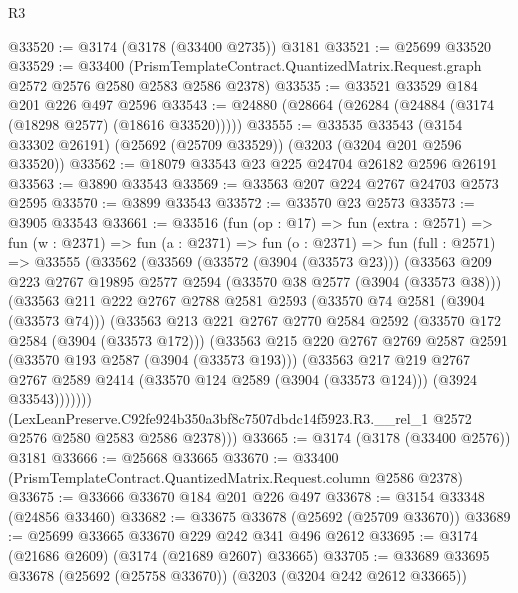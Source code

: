 \begin{lexlean}{R3}
\begin{coremodule}
@33520 := @3174 (@3178 (@33400 @2735)) @3181
@33521 := @25699 @33520
@33529 := @33400
    (PrismTemplateContract.QuantizedMatrix.Request.graph @2572 @2576 @2580 @2583 @2586 @2378)
@33535 := @33521 @33529 @184 @201 @226 @497 @2596
@33543 := @24880 (@28664 (@26284 (@24884 (@3174 (@18298 @2577) (@18616 @33520)))))
@33555 := @33535
    @33543
    (@3154 @33302 @26191)
    (@25692 (@25709 @33529))
    (@3203 (@3204 @201 @2596 @33520))
@33562 := @18079 @33543 @23 @225 @24704 @26182 @2596 @26191
@33563 := @3890 @33543
@33569 := @33563 @207 @224 @2767 @24703 @2573 @2595
@33570 := @3899 @33543
@33572 := @33570 @23 @2573
@33573 := @3905 @33543
@33661 := @33516
    (fun (op : @17) =>
    fun (extra : @2571) =>
    fun (w : @2371) =>
    fun (a : @2371) =>
    fun (o : @2371) =>
    fun (full : @2571) =>
    @33555
      (@33562
        (@33569
          (@33572 (@3904 (@33573 @23)))
          (@33563
            @209
            @223
            @2767
            @19895
            @2577
            @2594
            (@33570 @38 @2577 (@3904 (@33573 @38)))
            (@33563
              @211
              @222
              @2767
              @2788
              @2581
              @2593
              (@33570 @74 @2581 (@3904 (@33573 @74)))
              (@33563
                @213
                @221
                @2767
                @2770
                @2584
                @2592
                (@33570 @172 @2584 (@3904 (@33573 @172)))
                (@33563
                  @215
                  @220
                  @2767
                  @2769
                  @2587
                  @2591
                  (@33570 @193 @2587 (@3904 (@33573 @193)))
                  (@33563
                    @217
                    @219
                    @2767
                    @2767
                    @2589
                    @2414
                    (@33570 @124 @2589 (@3904 (@33573 @124)))
                    (@3924 @33543)))))))
        (LexLeanPreserve.C92fe924b350a3bf8c7507dbdc14f5923.R3.__rel_1
          @2572
          @2576
          @2580
          @2583
          @2586
          @2378)))
@33665 := @3174 (@3178 (@33400 @2576)) @3181
@33666 := @25668 @33665
@33670 := @33400 (PrismTemplateContract.QuantizedMatrix.Request.column @2586 @2378)
@33675 := @33666 @33670 @184 @201 @226 @497
@33678 := @3154 @33348 (@24856 @33460)
@33682 := @33675 @33678 (@25692 (@25709 @33670))
@33689 := @25699 @33665 @33670 @229 @242 @341 @496 @2612
@33695 := @3174 (@21686 @2609) (@3174 (@21689 @2607) @33665)
@33705 := @33689 @33695 @33678 (@25692 (@25758 @33670)) (@3203 (@3204 @242 @2612 @33665))

\end{coremodule}
\end{lexlean}
